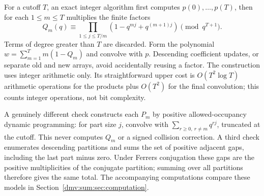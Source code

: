 \documentclass[11pt,letterpaper]{article}
\numberwithin{equation}{section}
\theoremstyle{definition}\newtheorem{definition}[theorem]{Definition}
\theoremstyle{remark}\newtheorem{remark}[theorem]{Remark}
\begin{document}
For a cutoff $T$, an exact integer algorithm first computes $p(0),\ldots,p(T)$, then for each $1\le m\le T$ multiplies the finite factors
\begin{equation}\label{dmv:sum:eq:polynomial}
 Q_m(q)\equiv\prod_{1\le j\le T/m}(1-q^{mj}+q^{(m+1)j})\pmod{q^{T+1}}.
\end{equation}
Terms of degree greater than $T$ are discarded. Form the polynomial $w=\sum_{m=1}^T m(1-Q_m)$ and convolve with $p$. Descending coefficient updates, or separate old and new arrays, avoid accidentally reusing a factor. The construction uses integer arithmetic only. Its straightforward upper cost is $O(T^2\log T)$ arithmetic operations for the products plus $O(T^2)$ for the final convolution; this counts integer operations, not bit complexity.

A genuinely different check constructs each $P_m$ by positive allowed-occupancy dynamic programming: for part size $j$, convolve with $\sum_{r\ge0,\ r\ne m}q^{rj}$, truncated at the cutoff. This never computes $Q_m$ or a signed collision correction. A third check enumerates descending partitions and sums the set of positive adjacent gaps, including the last part minus zero. Under Ferrers conjugation these gaps are the positive multiplicities of the conjugate partition; summing over all partitions therefore gives the same total. The accompanying computations compare these models in Section~\ref{dmv:sum:sec:computation}.
\end{document}
